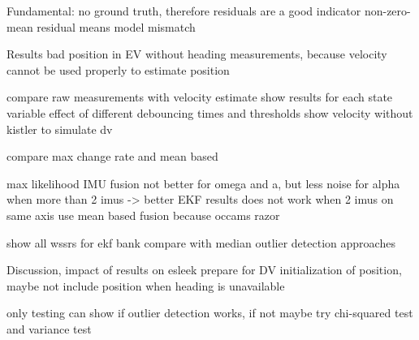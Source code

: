 

Fundamental: no ground truth, therefore residuals are a good indicator
non-zero-mean residual means model mismatch~\cite[p.~158]{AlexanderWischnewski.2019}

Results
bad position in EV without heading measurements, because velocity cannot be used properly to estimate position

compare raw measurements with velocity estimate
show results for each state variable
effect of different debouncing times and thresholds
show velocity without kistler to simulate dv


compare max change rate and mean based

max likelihood IMU fusion not better for omega and a, but less noise for alpha when more than 2 imus -> better EKF results
does not work when 2 imus on same axis
use mean based fusion because occams razor

show all wssrs for ekf bank
compare with median outlier detection approaches


Discussion, impact of results on esleek
prepare for DV
initialization of position, maybe not include position when heading is unavailable

only testing can show if outlier detection works, if not maybe try chi-squared test and variance test
